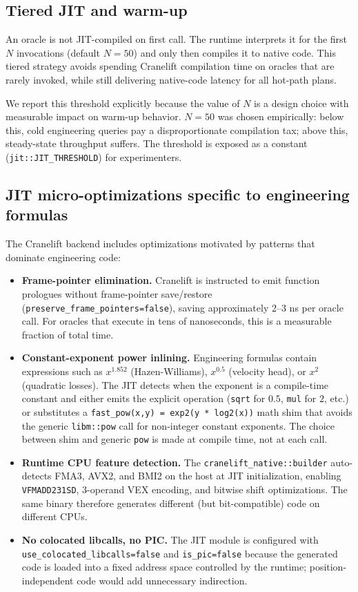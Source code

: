 \documentclass[11pt,a4paper]{article}
\begin{document}
\subsection{Tiered JIT and warm-up}
\label{sec:tiered-jit}

An oracle is not JIT-compiled on first call. The runtime interprets it for the first $N$ invocations (default $N=50$) and only then compiles it to native code. This tiered strategy avoids spending Cranelift compilation time on oracles that are rarely invoked, while still delivering native-code latency for all hot-path plans.

We report this threshold explicitly because the value of $N$ is a design choice with measurable impact on warm-up behavior. $N=50$ was chosen empirically: below this, cold engineering queries pay a disproportionate compilation tax; above this, steady-state throughput suffers. The threshold is exposed as a constant (\texttt{jit::JIT\_THRESHOLD}) for experimenters.

\subsection{JIT micro-optimizations specific to engineering formulas}

The Cranelift backend includes optimizations motivated by patterns that dominate engineering code:

\begin{itemize}[leftmargin=*]
\item \textbf{Frame-pointer elimination.} Cranelift is instructed to emit function prologues without frame-pointer save/restore (\texttt{preserve\_frame\_pointers=false}), saving approximately 2--3 ns per oracle call. For oracles that execute in tens of nanoseconds, this is a measurable fraction of total time.
\item \textbf{Constant-exponent power inlining.} Engineering formulas contain expressions such as $x^{1.852}$ (Hazen-Williams), $x^{0.5}$ (velocity head), or $x^2$ (quadratic losses). The JIT detects when the exponent is a compile-time constant and either emits the explicit operation (\texttt{sqrt} for $0.5$, \texttt{mul} for $2$, etc.) or substitutes a \texttt{fast\_pow(x,y) = exp2(y * log2(x))} math shim that avoids the generic \texttt{libm::pow} call for non-integer constant exponents. The choice between shim and generic \texttt{pow} is made at compile time, not at each call.
\item \textbf{Runtime CPU feature detection.} The \texttt{cranelift\_native::builder} auto-detects FMA3, AVX2, and BMI2 on the host at JIT initialization, enabling \texttt{VFMADD231SD}, 3-operand VEX encoding, and bitwise shift optimizations. The same binary therefore generates different (but bit-compatible) code on different CPUs.
\item \textbf{No colocated libcalls, no PIC.} The JIT module is configured with \texttt{use\_colocated\_libcalls=false} and \texttt{is\_pic=false} because the generated code is loaded into a fixed address space controlled by the runtime; position-independent code would add unnecessary indirection.
\end{itemize}
\end{document}
